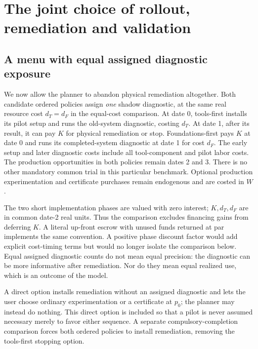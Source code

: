 \documentclass[11pt]{article}
\begin{document}
\section{The joint choice of rollout, remediation and validation}\label{sec:planner}
\subsection{A menu with equal assigned diagnostic exposure}
We now allow the planner to abandon physical remediation altogether. Both candidate ordered policies assign \emph{one} shadow diagnostic, at the same real resource cost $d_T=d_F$ in the equal-cost comparison. At date 0, tools-first installs its pilot setup and runs the old-system diagnostic, costing $d_T$. At date 1, after its result, it can pay $K$ for physical remediation or stop. Foundations-first pays $K$ at date 0 and runs its completed-system diagnostic at date 1 for cost $d_F$. The early setup and later diagnostic costs include all tool-component and pilot labor costs. The production opportunities in both policies remain dates 2 and 3. There is no other mandatory common trial in this particular benchmark. Optional production experimentation and certificate purchases remain endogenous and are costed in $W$.

The two short implementation phases are valued with zero interest; $K,d_T,d_F$ are in common date-2 real units. Thus the comparison excludes financing gains from deferring $K$. A literal up-front escrow with unused funds returned at par implements the same convention. A positive phase discount factor would add explicit cost-timing terms but would no longer isolate the comparison below. Equal assigned diagnostic counts do not mean equal precision: the diagnostic can be more informative after remediation. Nor do they mean equal realized use, which is an outcome of the model.

A direct option installs remediation without an assigned diagnostic and lets the user choose ordinary experimentation or a certificate at $p_0$; the planner may instead do nothing. This direct option is included so that a pilot is never assumed necessary merely to favor either sequence. A separate compulsory-completion comparison forces both ordered policies to install remediation, removing the tools-first stopping option.
\end{document}
